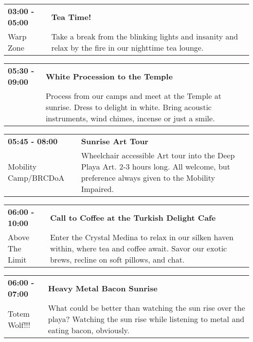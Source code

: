 \begin{tabular}{ p{1in} p{2.2in} }
    \textbf{03:00 - 05:00} & \textbf{Tea Time!} \\
    Warp Zone \newline  & Take a break from the blinking lights and insanity and relax by the fire in our nighttime tea lounge. \\
    \hline 
\end{tabular}
    
\begin{tabular}{ p{1in} p{2.2in} }
    \textbf{05:30 - 09:00} & \textbf{White Procession to the Temple} \\
    ~ \newline  & Process from our camps and meet at the Temple at sunrise. Dress to delight in white. Bring acoustic instruments, wind chimes, incense or just a smile. \\
    \hline 
\end{tabular}
    
\begin{tabular}{ p{1in} p{2.2in} }
    \textbf{05:45 - 08:00} & \textbf{Sunrise Art Tour} \\
    Mobility Camp/BRCDoA \newline  & Wheelchair accessible Art tour into the Deep Playa Art.
2-3 hours long. All welcome, but preference always given to the Mobility Impaired. \\
    \hline 
\end{tabular}
    
\begin{tabular}{ p{1in} p{2.2in} }
    \textbf{06:00 - 10:00} & \textbf{Call to Coffee at the Turkish Delight Cafe} \\
    Above The Limit \newline  & Enter the Crystal Medina to relax in our silken haven within, where tea and coffee await. Savor our exotic brews, recline on soft pillows, and chat. \\
    \hline 
\end{tabular}
    
\begin{tabular}{ p{1in} p{2.2in} }
    \textbf{06:00 - 07:00} & \textbf{Heavy Metal Bacon Sunrise} \\
    Totem Wolf!!! \newline  & What could be better than watching the sun rise over the playa? Watching the sun rise while listening to metal and eating bacon, obviously. \\
    \hline 
\end{tabular}
    

